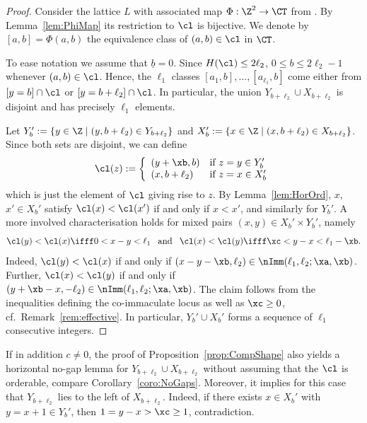 \begin{proof}
Consider the lattice $L$ with associated 
map $\Phi:\Z^2\to\CT$ from . By 
Lemma~\ref{lem:PhiMap} its restriction 
to $\cl$ is bijective. 
We denote by 
$[a,b]=\Phi(a,b)$ the equivalence class 
of $(a,b)\in\cl$ in $\CT$. 

To ease notation we assume that 
$\underline b=0$. Since $H(\cl)\leq2\ell_2$, 
$0\leq b\leq2\ell_2-1$ whenever
$(a,b)\in\cl$. Hence, the $\ell_1$ 
classes $[a_1,b],\ldots,[a_{\ell_1},b]$ 
come either from $[y=b]\cap\cl$ or 
$[y=b+\ell_2]\cap\cl$. In particular, 
the union $Y_{b+\ell_2}\cup X_{b+\ell_2}$ 
is disjoint and has precisely $\ell_1$ elements. 

Let $Y_b':=\{y\in\Z\mid (y,b+\ell_2)\in Y_{b+\ell_2}\}$ 
and $X_b':=\{x\in\Z\mid (x,b+\ell_2)\in X_{b+\ell_2}\}$. 
Since both sets are disjoint, we can define
$$
\cl(z):=\left\{\begin{array}{ll}
(y+\xb,b)& \mbox{if }z=y\in Y_b'
\\
(x,b+\ell_2)& \mbox{if }z=x\in X_b'
\end{array}\right.
$$
which is just the element of $\cl$ 
giving rise to $z$. By Lemma~\ref{lem:HorOrd},
$x$, $x'\in X_b'$ satisfy $\cl(x)<\cl(x')$ 
if and only if $x<x'$, and similarly for $Y_b'$. 
A more involved characterisation holds for
mixed pairs $(x,y)\in X_b'\times Y_b'$, namely
$$
\cl(y)<\cl(x) \ifff 0<x-y<\ell_1
\hspace{0.8em}\mbox{and}\hspace{0.8em}
\cl(x)<\cl(y) \ifff \xc<y-x<\ell_1-\xb.
$$
Indeed, $\cl(y)<\cl(x)$ if and only if 
$(x-y-\xb,\ell_2)\in\nImm(\ell_1,\ell_2;\xa,\xb)$.
Further, $\cl(x)<\cl(y)$ if and only if
$(y+\xb-x,-\ell_2)\in\nImm(\ell_1,\ell_2;\xa,\xb)$. 
The claim follows from the inequalities defining
the {co-immaculate} locus as well as $\xc\geq0$, cf.\ 
Remark~\ref{rem:effective}. In particular, 
$Y_b'\cup X_b'$ forms a sequence of $\ell_1$ 
consecutive integers.
\end{proof}

\begin{rema}
\label{rem:LR}
If in addition $c\not=0$, the proof of 
Proposition~\ref{prop:CompShape} 
also yields a horizontal no-gap lemma
for $Y_{b+\ell_2}\cup X_{b+\ell_2}$
without assuming that the {\mes} $\cl$ is orderable,
compare Corollary~\ref{coro:NoGaps}.
Moreover, it implies for this case that $Y_{b+\ell_2}$ lies 
to the left of $X_{b+\ell_2}$.
Indeed, if there exists $x\in X_b'$ 
with $y=x+1\in Y_b'$, then
$1=y-x>\xc\geq 1$, contradiction.
\end{rema}

